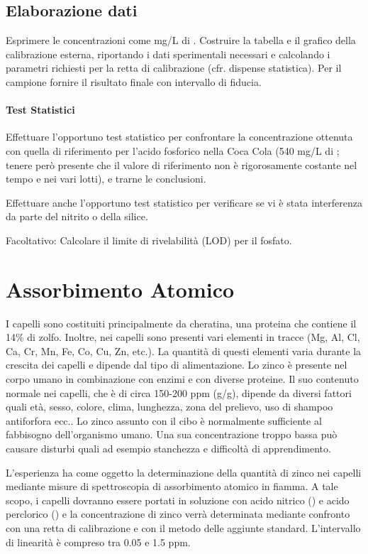 \subsection{Elaborazione dati}

Esprimere le concentrazioni come mg/L di . Costruire la tabella e il grafico della calibrazione esterna, riportando i dati sperimentali necessari e calcolando i parametri richiesti per la retta di calibrazione (cfr. dispense statistica). Per il campione fornire il risultato finale con intervallo di fiducia.

\paragraph{Test Statistici}
Effettuare l'opportuno test statistico per confrontare la concentrazione ottenuta con quella di riferimento per l'acido fosforico nella Coca Cola (540 mg/L di ; tenere però presente che il valore di riferimento non è rigorosamente costante nel tempo e nei vari lotti), e trarne le conclusioni.

Effettuare anche l'opportuno test statistico per verificare se vi è stata interferenza da parte del nitrito o della silice.

Facoltativo: Calcolare il limite di rivelabilità (LOD) per il fosfato.


\section{Assorbimento Atomico}

I capelli sono costituiti principalmente da cheratina, una proteina che contiene il 14\% di zolfo. Inoltre, nei capelli sono presenti vari elementi in tracce (Mg, Al, Cl, Ca, Cr, Mn, Fe, Co, Cu, Zn, etc.). La quantità di questi elementi varia durante la crescita dei capelli e dipende dal tipo di alimentazione. Lo zinco è presente nel corpo umano in combinazione con enzimi e con diverse proteine. Il suo contenuto normale nei capelli, che è di circa 150-200 ppm (\mu g/g), dipende da diversi fattori quali età, sesso, colore, clima, lunghezza, zona del prelievo, uso di shampoo antiforfora ecc.. Lo zinco assunto con il cibo è normalmente sufficiente al fabbisogno dell'organismo umano. Una sua concentrazione troppo bassa può causare disturbi quali ad esempio stanchezza e difficoltà di apprendimento.

L'esperienza ha come oggetto la determinazione della quantità di zinco nei capelli mediante misure di spettroscopia di assorbimento atomico in fiamma. A tale scopo, i capelli dovranno essere portati in soluzione con acido nitrico () e acido perclorico () e la concentrazione di zinco verrà determinata mediante confronto con una retta di calibrazione e con il metodo delle aggiunte standard. L'intervallo di linearità è compreso tra 0.05 e 1.5 ppm.

